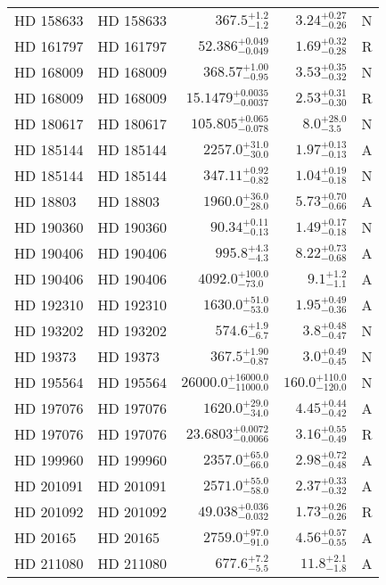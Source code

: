 \begin{longtable*}{llrrr}
HD 158633 & HD 158633 & $367.5^{+1.2}_{-1.2}$ & $3.24^{+0.27}_{-0.26}$ & N \\ 
HD 161797 & HD 161797 & $52.386^{+0.049}_{-0.049}$ & $1.69^{+0.32}_{-0.28}$ & R \\ 
HD 168009 & HD 168009 & $368.57^{+1.00}_{-0.95}$ & $3.53^{+0.35}_{-0.32}$ & N \\ 
HD 168009 & HD 168009 & $15.1479^{+0.0035}_{-0.0037}$ & $2.53^{+0.31}_{-0.30}$ & R \\ 
HD 180617 & HD 180617 & $105.805^{+0.065}_{-0.078}$ & $8.0^{+28.0}_{-3.5}$ & N \\ 
HD 185144 & HD 185144 & $2257.0^{+31.0}_{-30.0}$ & $1.97^{+0.13}_{-0.13}$ & A \\ 
HD 185144 & HD 185144 & $347.11^{+0.92}_{-0.82}$ & $1.04^{+0.19}_{-0.18}$ & N \\ 
HD 18803 & HD 18803 & $1960.0^{+36.0}_{-28.0}$ & $5.73^{+0.70}_{-0.66}$ & A \\ 
HD 190360 & HD 190360 & $90.34^{+0.11}_{-0.13}$ & $1.49^{+0.17}_{-0.18}$ & N \\ 
HD 190406 & HD 190406 & $995.8^{+4.3}_{-4.3}$ & $8.22^{+0.73}_{-0.68}$ & A \\ 
HD 190406 & HD 190406 & $4092.0^{+100.0}_{-73.0}$ & $9.1^{+1.2}_{-1.1}$ & A \\ 
HD 192310 & HD 192310 & $1630.0^{+51.0}_{-53.0}$ & $1.95^{+0.49}_{-0.36}$ & A \\ 
HD 193202 & HD 193202 & $574.6^{+1.9}_{-6.7}$ & $3.8^{+0.48}_{-0.47}$ & N \\ 
HD 19373 & HD 19373 & $367.5^{+1.90}_{-0.87}$ & $3.0^{+0.49}_{-0.45}$ & N \\ 
HD 195564 & HD 195564 & $26000.0^{+16000.0}_{-11000.0}$ & $160.0^{+110.0}_{-120.0}$ & N \\ 
HD 197076 & HD 197076 & $1620.0^{+29.0}_{-34.0}$ & $4.45^{+0.44}_{-0.42}$ & A \\ 
HD 197076 & HD 197076 & $23.6803^{+0.0072}_{-0.0066}$ & $3.16^{+0.55}_{-0.49}$ & R \\ 
HD 199960 & HD 199960 & $2357.0^{+65.0}_{-66.0}$ & $2.98^{+0.72}_{-0.48}$ & A \\ 
HD 201091 & HD 201091 & $2571.0^{+55.0}_{-58.0}$ & $2.37^{+0.33}_{-0.32}$ & A \\ 
HD 201092 & HD 201092 & $49.038^{+0.036}_{-0.032}$ & $1.73^{+0.26}_{-0.26}$ & R \\ 
HD 20165 & HD 20165 & $2759.0^{+97.0}_{-91.0}$ & $4.56^{+0.57}_{-0.55}$ & A \\ 
HD 211080 & HD 211080 & $677.6^{+7.2}_{-5.5}$ & $11.8^{+2.1}_{-1.8}$ & A \\ 

\end{longtable*}
